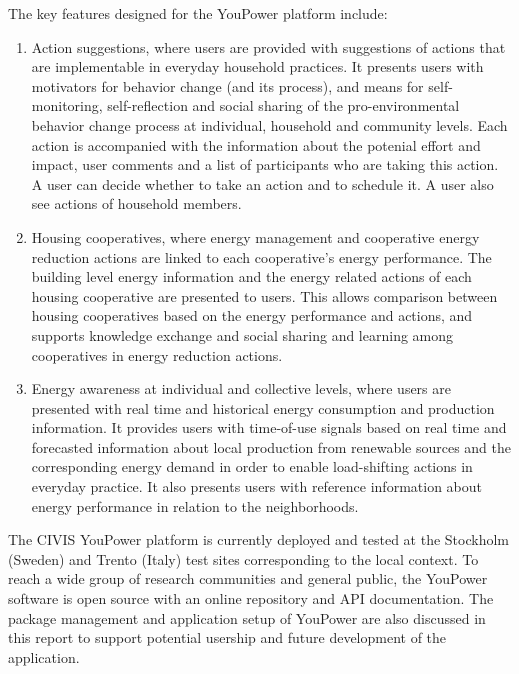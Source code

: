The key features designed for the YouPower platform include: 

\begin{enumerate}
\item Action suggestions, where users are provided with suggestions of actions that are implementable in everyday household practices. 
% 
It presents users with motivators for behavior change (and its process), and means for self-monitoring, self-reflection and social sharing of the pro-environmental behavior change process at individual, household and community levels. 
Each action is accompanied with the information about the potenial effort and impact, user comments and a list of participants who are taking this action. A user can decide whether to take an action and to schedule it. A user also see actions of household members. 

\item Housing cooperatives, where energy management and cooperative energy reduction actions are linked to each cooperative's energy performance. 
% 
The building level energy information and the energy related actions of each housing cooperative are presented to users. This allows comparison between housing cooperatives based on the energy performance and actions, and supports knowledge exchange and social sharing and learning among cooperatives in energy reduction actions.

\item Energy awareness at individual and collective levels, where users are presented with real time and historical energy consumption and production information. 
% 
It provides users with time-of-use signals based on real time and forecasted information about local production from renewable sources and the corresponding energy demand in order to enable load-shifting actions in everyday practice. It also presents users with reference information about energy performance in relation to the neighborhoods. 

\end{enumerate}

The CIVIS YouPower platform is currently deployed and tested at the Stockholm (Sweden) and Trento (Italy)
test sites corresponding to the local context. To reach a wide group of research communities and general public, the YouPower software is open source with an online repository and API documentation. The package management and application setup of YouPower are also discussed in this report to support potential usership and future development of the application. 
